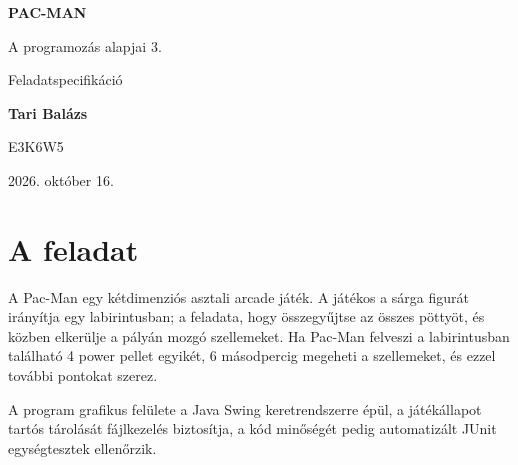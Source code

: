 \documentclass[11pt, a4paper]{article}
\begin{document}
\begin{titlepage}
    \centering
    \vspace*{4cm}
    {\Huge \textbf{PAC-MAN} \par}
    \vspace{1.5cm}
    {\LARGE A programozás alapjai 3. \par}
    \vspace{0.5cm}
    {\Large Feladatspecifikáció \par}
    
    \vspace{4.5cm}
    
    {\Large \textbf{Tari Balázs} \par}
    \vspace{0.3cm}
    {\Large E3K6W5 \par}
    
    \vfill
    
    {\large 2026. október 16. \par}
    \vspace{0.2cm}
\end{titlepage}

\tableofcontents
\newpage

\section{A feladat}
A Pac-Man egy kétdimenziós asztali arcade játék. A játékos a sárga figurát irányítja egy labirintusban; a feladata, hogy összegyűjtse az összes pöttyöt, és közben elkerülje a pályán mozgó szellemeket. Ha Pac-Man felveszi a labirintusban található 4 power pellet egyikét, 6 másodpercig megeheti a szellemeket, és ezzel további pontokat szerez.

A program grafikus felülete a Java Swing keretrendszerre épül, a játékállapot tartós tárolását fájlkezelés biztosítja, a kód minőségét pedig automatizált JUnit egységtesztek ellenőrzik.

\end{document}
